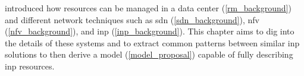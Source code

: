  introduced how resources can be managed in a data center (\autoref{rm_background}) and different network techniques such as \gls{sdn} (\autoref{sdn_background}), \gls{nfv} (\autoref{nfv_background}), and \gls{inp} (\autoref{inp_background}).
This chapter aims to dig into the details of these systems and to extract common patterns between similar \gls{inp} solutions to then derive a model (\autoref{model_proposal}) capable of fully describing \gls{inp} resources.